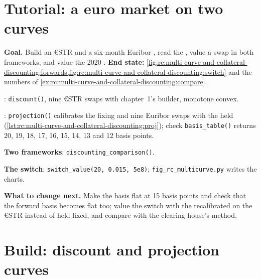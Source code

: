 \section{Tutorial: a euro market on two curves}\label{tut:rc:multi-curve-and-collateral-discounting:tutorial}

\begin{tutorial}
\textbf{Goal.} Build an €STR  and a six-month Euribor , read the , value a swap in both frameworks, and value the
2020 . \textbf{End state:}
\cref{fig:rc:multi-curve-and-collateral-discounting:forwards,fig:rc:multi-curve-and-collateral-discounting:switch}
and the numbers of \cref{ex:rc:multi-curve-and-collateral-discounting:compare}.
\begin{tutsteps}
\item \textbf{}: \texttt{discount()}, nine €STR swaps with
chapter~1's builder, monotone convex.
\item \textbf{}: \texttt{projection()} calibrates the fixing and
nine Euribor swaps with the  held (\cref{lst:rc:multi-curve-and-collateral-discounting:proj}); check
\texttt{basis\_table()} returns 20, 19, 18, 17, 16, 15, 14, 13 and 12 basis
points.
\item \textbf{Two frameworks}: \texttt{discounting\_comparison()}.
\item \textbf{The switch}: \texttt{switch\_value(20, 0.015, 5e8)};
\texttt{fig\_rc\_multicurve.py} writes the charts.
\end{tutsteps}
\textbf{What to change next.} Make the basis flat at 15 basis points and check
that the forward basis becomes flat too; value the switch with the  recalibrated on the €STR  instead of held fixed, and
compare with the clearing house's method.
\end{tutorial}

\section{Build: discount and projection curves}\label{bld:rc:multi-curve-and-collateral-discounting:multicurve}


